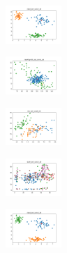 \begin{figure}[H]
    \begin{subfigure}
        \centering
        \includegraphics[width=0.234\textwidth]{img/aggsf/rand_set_const_20_277451237_clust.png}
    \end{subfigure}
    \hfill
    \begin{subfigure}
        \centering
        \includegraphics[width=0.234\textwidth]{img/aggsf/newthyroid_set_const_20_277451237_clust.png}
    \end{subfigure}
    \hfill
    \begin{subfigure}
        \centering
        \includegraphics[width=0.234\textwidth]{img/aggsf/iris_set_const_20_49258669_clust.png}
    \end{subfigure}
    \hfill
    \begin{subfigure}
        \centering
        \includegraphics[width=0.234\textwidth]{img/aggsf/ecoli_set_const_20_49258669_clust.png}
    \end{subfigure}
    \hfill
    \begin{subfigure}
        \centering
        \includegraphics[width=0.234\textwidth]{img/aggsf/rand_set_const_20_49258669_clust.png}
    \end{subfigure}
    \hfill
    \begin{subfigure}
        \centering

\end{subfigure}
\end{figure}

